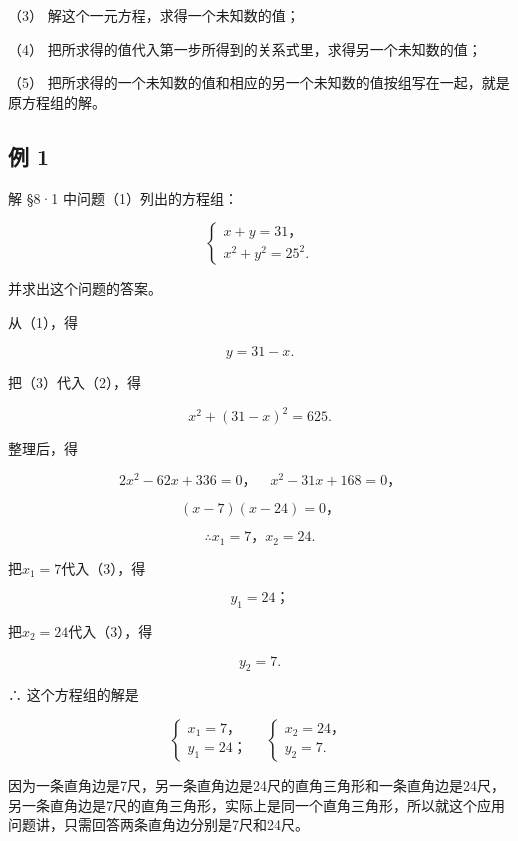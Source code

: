 （3） 解这个一元方程，求得一个未知数的值；

（4） 把所求得的值代入第一步所得到的关系式里，求得另一个未知数的值；

（5）
把所求得的一个未知数的值和相应的另一个未知数的值按组写在一起，就是原方程组的解。

\subsection{例 1}

解 §8·1 中问题（1）列出的方程组：

\[
\left\{ \begin{array}{l} x + y = 31\text{，} \\ x ^ {2} + y ^ {2} = 25 ^ {2}. \end{array} \right. \tag{1}
\]

并求出这个问题的答案。

 从（1），得

\[
y = 31 - x. \tag{3}
\]

把（3）代入（2），得

\[
x ^ {2} + (31 - x) ^ {2} = 625.
\]

整理后，得

\[
2 x ^ {2} - 62 x + 336 = 0\text{，} \quad x ^ {2} - 31 x + 168 = 0\text{，}
\]

\[
(x - 7) (x - 24) = 0\text{，}
\]

\[
\therefore x _ {1} = 7\text{，} x _ {2} = 24.
\]

把\(x_{1} = 7\)代入（3），得

\[
y _ {1} = 24\text{；}
\]

把\(x_{2} = 24\)代入（3），得

\[
y _ {2} = 7.
\]

∴ 这个方程组的解是

\[
\left\{ \begin{array}{l} x _ {1} = 7\text{，} \\ y _ {1} = 24\text{；} \end{array} \right. \quad \left\{ \begin{array}{l} x _ {2} = 24\text{，} \\ y _ {2} = 7. \end{array} \right.
\]

因为一条直角边是7尺，另一条直角边是24尺的直角三角形和一条直角边是24尺，另一条直角边是7尺的直角三角形，实际上是同一个直角三角形，所以就这个应用问题讲，只需回答两条直角边分别是7尺和24尺。

